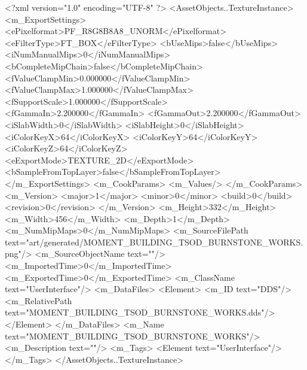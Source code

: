 <?xml version="1.0" encoding="UTF-8" ?>
<AssetObjects..TextureInstance>
	<m_ExportSettings>
		<ePixelformat>PF_R8G8B8A8_UNORM</ePixelformat>
		<eFilterType>FT_BOX</eFilterType>
		<bUseMips>false</bUseMips>
		<iNumManualMips>0</iNumManualMips>
		<bCompleteMipChain>false</bCompleteMipChain>
		<fValueClampMin>0.000000</fValueClampMin>
		<fValueClampMax>1.000000</fValueClampMax>
		<fSupportScale>1.000000</fSupportScale>
		<fGammaIn>2.200000</fGammaIn>
		<fGammaOut>2.200000</fGammaOut>
		<iSlabWidth>0</iSlabWidth>
		<iSlabHeight>0</iSlabHeight>
		<iColorKeyX>64</iColorKeyX>
		<iColorKeyY>64</iColorKeyY>
		<iColorKeyZ>64</iColorKeyZ>
		<eExportMode>TEXTURE_2D</eExportMode>
		<bSampleFromTopLayer>false</bSampleFromTopLayer>
	</m_ExportSettings>
	<m_CookParams>
		<m_Values/>
	</m_CookParams>
	<m_Version>
		<major>1</major>
		<minor>0</minor>
		<build>0</build>
		<revision>0</revision>
	</m_Version>
	<m_Height>332</m_Height>
	<m_Width>456</m_Width>
	<m_Depth>1</m_Depth>
	<m_NumMipMaps>0</m_NumMipMaps>
	<m_SourceFilePath text="art/generated/MOMENT_BUILDING_TSOD_BURNSTONE_WORKS.png"/>
	<m_SourceObjectName text=""/>
	<m_ImportedTime>0</m_ImportedTime>
	<m_ExportedTime>0</m_ExportedTime>
	<m_ClassName text="UserInterface"/>
	<m_DataFiles>
		<Element>
			<m_ID text="DDS"/>
			<m_RelativePath text="MOMENT_BUILDING_TSOD_BURNSTONE_WORKS.dds"/>
		</Element>
	</m_DataFiles>
	<m_Name text="MOMENT_BUILDING_TSOD_BURNSTONE_WORKS"/>
	<m_Description text=""/>
	<m_Tags>
		<Element text="UserInterface"/>
	</m_Tags>
</AssetObjects..TextureInstance>
